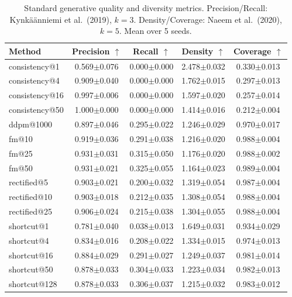 \begin{table}[t]
\centering
\caption{Standard generative quality and diversity metrics. Precision/Recall: Kynk\"a\"anniemi et al.\ (2019), $k{=}3$. Density/Coverage: Naeem et al.\ (2020), $k{=}5$. Mean over 5 seeds.}
\label{tab:precision_recall}
\footnotesize
\begin{tabular}{lcccc}
\toprule
Method & Precision $\uparrow$ & Recall $\uparrow$ & Density $\uparrow$ & Coverage $\uparrow$ \\
\midrule
  consistency@1 & 0.569$\pm$0.076 & 0.000$\pm$0.000 & 2.478$\pm$0.032 & 0.330$\pm$0.013 \\
  consistency@4 & 0.909$\pm$0.040 & 0.000$\pm$0.000 & 1.762$\pm$0.015 & 0.297$\pm$0.013 \\
  consistency@16 & 0.997$\pm$0.006 & 0.000$\pm$0.000 & 1.597$\pm$0.020 & 0.257$\pm$0.014 \\
  consistency@50 & 1.000$\pm$0.000 & 0.000$\pm$0.000 & 1.414$\pm$0.016 & 0.212$\pm$0.004 \\
  ddpm@1000 & 0.897$\pm$0.046 & 0.295$\pm$0.022 & 1.246$\pm$0.029 & 0.970$\pm$0.017 \\
  fm@10 & 0.919$\pm$0.036 & 0.291$\pm$0.038 & 1.216$\pm$0.020 & 0.988$\pm$0.004 \\
  fm@25 & 0.931$\pm$0.031 & 0.315$\pm$0.050 & 1.176$\pm$0.020 & 0.988$\pm$0.002 \\
  fm@50 & 0.931$\pm$0.021 & 0.325$\pm$0.055 & 1.164$\pm$0.023 & 0.989$\pm$0.004 \\
  rectified@5 & 0.903$\pm$0.021 & 0.200$\pm$0.032 & 1.319$\pm$0.054 & 0.987$\pm$0.004 \\
  rectified@10 & 0.903$\pm$0.018 & 0.212$\pm$0.035 & 1.308$\pm$0.054 & 0.988$\pm$0.004 \\
  rectified@25 & 0.906$\pm$0.024 & 0.215$\pm$0.038 & 1.304$\pm$0.055 & 0.988$\pm$0.004 \\
  shortcut@1 & 0.781$\pm$0.040 & 0.038$\pm$0.013 & 1.649$\pm$0.031 & 0.934$\pm$0.029 \\
  shortcut@4 & 0.834$\pm$0.016 & 0.208$\pm$0.022 & 1.334$\pm$0.015 & 0.974$\pm$0.013 \\
  shortcut@16 & 0.884$\pm$0.029 & 0.291$\pm$0.027 & 1.249$\pm$0.037 & 0.981$\pm$0.014 \\
  shortcut@50 & 0.878$\pm$0.033 & 0.304$\pm$0.033 & 1.223$\pm$0.034 & 0.982$\pm$0.013 \\
  shortcut@128 & 0.878$\pm$0.033 & 0.306$\pm$0.037 & 1.215$\pm$0.032 & 0.983$\pm$0.012 \\
\bottomrule
\end{tabular}
\end{table}